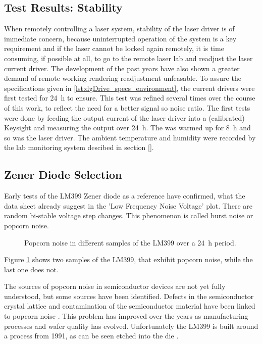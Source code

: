 \subsection{Test Results: Stability}
\label{sec:results_stability}
When remotely controlling a laser system, stability of the laser driver is of immediate concern, because uninterrupted operation of the system is a key requirement and if the laser cannot be locked again remotely, it is time consuming, if possible at all, to go to the remote laser lab and readjust the laser current driver. The development of the past years have also shown a greater demand of remote working rendering readjustment unfeasable. To assure the specifications given in \ref{lst:dgDrive_specs_environment}, the current drivers were first tested for \qty{24}{\hour} to ensure. This test was refined several times over the course of this work, to reflect the need for a better signal so noise ratio. The first tests were done by feeding the output current of the laser driver into a (calibrated) Keysight  and measuring the output over \qty{24}{\hour}. The  was warmed up for \qty{8}{\hour} and so was the laser driver. The ambient temperature and humidity were recorded by the lab monitoring system descibed in section \ref{}.


\subsection{Zener Diode Selection}
\label{sec:zener_diode_selection}
Early tests of the LM399 Zener diode as a reference have confirmed, what the data sheet \cite{datasheet_LM399} already suggest in the 'Low Frequency Noise Voltage' plot. There are random bi-stable voltage step changes. This phenomenon is called burst noise or popcorn noise.

\begin{figure}[ht]
    \centering
    
    \caption{Popcorn noise in different samples of the LM399 over a \qty{24}{\hour} period.}
    \label{fig:popcorn_noise_lm399}
\end{figure}

Figure \ref{fig:popcorn_noise_lm399} shows two samples of the LM399, that exhibit popcorn noise, while the last one does not.

The sources of popcorn noise in semiconductor devices are not yet fully understood, but some sources have been identified. Defects in the semiconductor crystal lattice and contamination of the semiconductor material have been linked to popcorn noise \cite{technote_ti_popcorn_noise}. This problem has improved over the years as manufacturing processes and wafer quality has evolved. Unfortunately the LM399 is built around a process from 1991, as can be seen etched into the die \cite{lm399_richi}.

